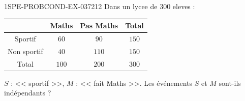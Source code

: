 \begin{exercice}{1SPE-PROBCOND-EX-037}{2}{12}
Dans un lycee de $300$ eleves :
\begin{center}
\begin{tabular}{|c|c|c|c|}
\hline
 & Maths & Pas Maths & Total \\
\hline
Sportif & $60$ & $90$ & $150$ \\
\hline
Non sportif & $40$ & $110$ & $150$ \\
\hline
Total & $100$ & $200$ & $300$ \\
\hline
\end{tabular}
\end{center}

$S$ : << sportif >>, $M$ : << fait Maths >>. Les événements $S$ et $M$ sont-ils indépendants ?
\end{exercice}
